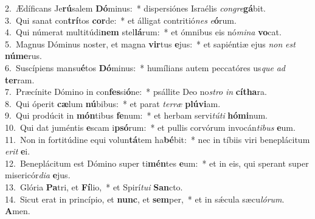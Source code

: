 {2.~}Ædíficans Je\textbf{rú}salem \textbf{Dó}minus:~* dispersiónes Israélis \textit{con}\textit{gre}\textbf{gá}bit.\\
{3.~}Qui sanat con\textbf{trí}tos \textbf{cor}de:~* et álligat contritió\textit{nes} \textit{e}\textbf{ó}rum.\\
{4.~}Qui númerat multitúdi\textbf{nem} stel\textbf{lá}rum:~* et ómnibus eis nó\textit{mi}\textit{na} \textbf{vo}cat.\\
{5.~}Magnus Dóminus noster, et magna \textbf{vir}tus \textbf{e}jus:~* et sapiéntiæ ejus \textit{non} \textit{est} \textbf{nú}\textbf{me}rus.\\
{6.~}Suscípiens mansu\textbf{é}tos \textbf{Dó}minus:~* humílians autem peccatóres us\textit{que} \textit{ad} \textbf{ter}ram.\\
{7.~}Præcínite Dómino in con\textbf{fes}si\textbf{ó}ne:~* psállite Deo no\textit{stro} \textit{in} \textbf{cí}\textbf{tha}ra.\\
{8.~}Qui óperit \textbf{cæ}lum \textbf{nú}bibus:~* et parat \textit{ter}\textit{ræ} \textbf{plú}\textbf{vi}am.\\
{9.~}Qui prodúcit in \textbf{món}tibus \textbf{fe}num:~* et herbam servi\textit{tú}\textit{ti} \textbf{hó}\textbf{mi}num.\\
{10.~}Qui dat juméntis \textbf{e}scam i\textbf{psó}rum:~* et pullis corvórum invocán\textit{ti}\textit{bus} \textbf{e}um.\\
{11.~}Non in fortitúdine equi volun\textbf{tá}tem ha\textbf{bé}bit:~* nec in tíbiis viri beneplácitum \textit{e}\textit{rit} \textbf{e}i.\\
{12.~}Beneplácitum est Dómino super ti\textbf{mén}tes \textbf{e}um:~* et in eis, qui sperant super misericór\textit{di}\textit{a} \textbf{e}jus.\\
{13.~}Glória \textbf{Pa}tri, et \textbf{Fí}lio,~* et Spirí\textit{tu}\textit{i} \textbf{San}cto.\\
{14.~}Sicut erat in princípio, et \textbf{nunc}, et \textbf{sem}per,~* et in sǽcula sæcu\textit{ló}\textit{rum}. \textbf{A}men.\\
